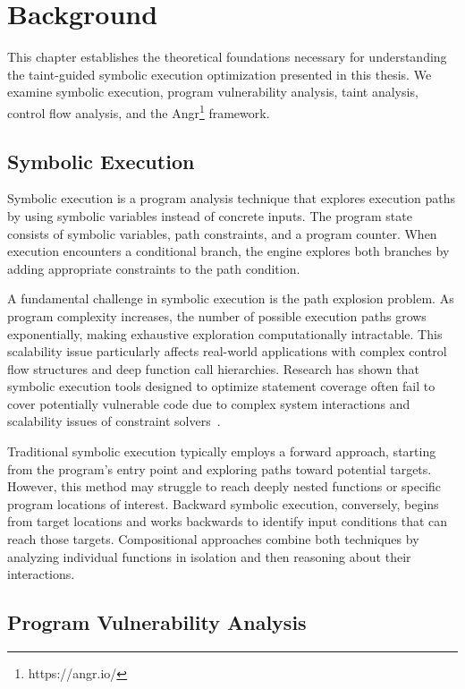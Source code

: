 \chapter{Background}\label{ch:background}

This chapter establishes the theoretical foundations necessary for understanding the taint-guided symbolic execution optimization presented in this thesis. We examine symbolic execution, program vulnerability analysis, taint analysis, control flow analysis, and the Angr\footnote{https://angr.io/} framework.

\section{Symbolic Execution}

Symbolic execution is a program analysis technique that explores execution paths by using symbolic variables instead of concrete inputs. The program state consists of symbolic variables, path constraints, and a program counter. When execution encounters a conditional branch, the engine explores both branches by adding appropriate constraints to the path condition.

A fundamental challenge in symbolic execution is the path explosion problem. As program complexity increases, the number of possible execution paths grows exponentially, making exhaustive exploration computationally intractable. This scalability issue particularly affects real-world applications with complex control flow structures and deep function call hierarchies. Research has shown that symbolic execution tools designed to optimize statement coverage often fail to cover potentially vulnerable code due to complex system interactions and scalability issues of constraint solvers~\cite{schwartz_all_2010}.

Traditional symbolic execution typically employs a forward approach, starting from the program's entry point and exploring paths toward potential targets. However, this method may struggle to reach deeply nested functions or specific program locations of interest. Backward symbolic execution, conversely, begins from target locations and works backwards to identify input conditions that can reach those targets. Compositional approaches combine both techniques by analyzing individual functions in isolation and then reasoning about their interactions.

\section{Program Vulnerability Analysis}

